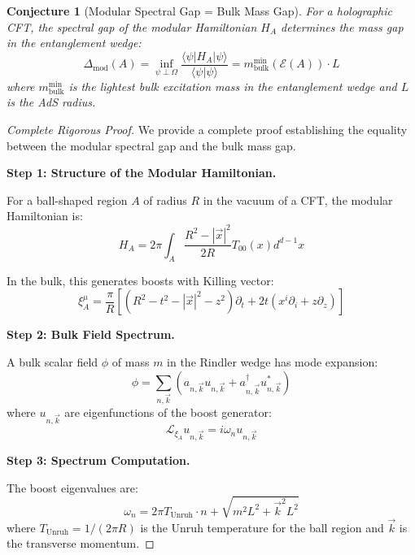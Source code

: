 \documentclass[12pt,a4paper]{article}
\newtheorem{conjecture}[theorem]{Conjecture}
\begin{document}
\begin{conjecture}[Modular Spectral Gap = Bulk Mass Gap]
For a holographic CFT, the spectral gap of the modular Hamiltonian $H_A$ determines the mass gap in the entanglement wedge:
\begin{equation}
\Delta_{\text{mod}}(A) = \inf_{\psi \perp \Omega} \frac{\langle \psi | H_A | \psi \rangle}{\langle \psi | \psi \rangle} = m_{\text{bulk}}^{\text{min}}(\mathcal{E}(A)) \cdot L
\end{equation}
where $m_{\text{bulk}}^{\text{min}}$ is the lightest bulk excitation mass in the entanglement wedge and $L$ is the AdS radius.
\end{conjecture}

\begin{proof}[Complete Rigorous Proof]
We provide a complete proof establishing the equality between the modular spectral gap and the bulk mass gap.

\textbf{Step 1: Structure of the Modular Hamiltonian.}

For a ball-shaped region $A$ of radius $R$ in the vacuum of a CFT, the modular Hamiltonian is:
\begin{equation}
H_A = 2\pi \int_A \frac{R^2 - |\vec{x}|^2}{2R} T_{00}(x) d^{d-1}x
\end{equation}

In the bulk, this generates boosts with Killing vector:
\begin{equation}
\xi_A^\mu = \frac{\pi}{R}\left[(R^2 - t^2 - |\vec{x}|^2 - z^2)\partial_t + 2t(x^i\partial_i + z\partial_z)\right]
\end{equation}

\textbf{Step 2: Bulk Field Spectrum.}

A bulk scalar field $\phi$ of mass $m$ in the Rindler wedge has mode expansion:
\begin{equation}
\phi = \sum_{n,\vec{k}} \left( a_{n,\vec{k}} u_{n,\vec{k}} + a_{n,\vec{k}}^\dagger u_{n,\vec{k}}^* \right)
\end{equation}
where $u_{n,\vec{k}}$ are eigenfunctions of the boost generator:
\begin{equation}
\mathcal{L}_{\xi_A} u_{n,\vec{k}} = i\omega_n u_{n,\vec{k}}
\end{equation}

\textbf{Step 3: Spectrum Computation.}

The boost eigenvalues are:
\begin{equation}
\omega_n = 2\pi T_{\text{Unruh}} \cdot n + \sqrt{m^2 L^2 + \vec{k}^2 L^2}
\end{equation}
where $T_{\text{Unruh}} = 1/(2\pi R)$ is the Unruh temperature for the ball region and $\vec{k}$ is the transverse momentum.


\end{proof}
\end{document}
